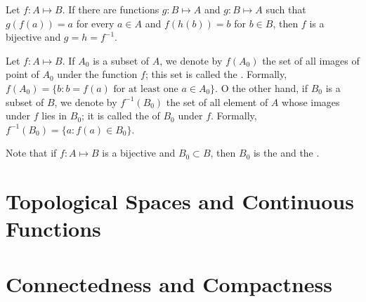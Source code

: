 \begin{lemmad}
Let $f: A \mapsto B$. If there are functions $g: B \mapsto A$ and $g: B \mapsto A$ such that $g(f(a)) = a$ for every $a \in A$ and $f(h(b)) = b$ for $b \in B$, then $f$ is a bijective and $g = h = f^{-1}$.
\end{lemmad}

\begin{definition}
Let $f: A \mapsto B$. If $A_0$ is a subset of $A$, we denote by $f(A_0)$ the set of all images of point of $A_0$ under the function $f$; this set is called the \textbf{}. Formally, $f(A_0) = \{b: b = f(a) \text{ for at least one } a\in A_0\}$. O the other hand, if $B_0$ is a subset of $B$, we denote by $f^{-1}(B_0)$ the set of all element of $A$ whose images under $f$ lies in $B_0$; it is called the \textbf{} of $B_0$ under $f$. Formally, $f^{-1}(B_0) = \{a: f(a) \in B_0\}$.
\end{definition}

Note that if $f:A \mapsto B$ is a bijective and $B_0 \subset B$, then $B_0$ is the  and the . 





\section{Topological Spaces and Continuous Functions}

\section{Connectedness and Compactness}
